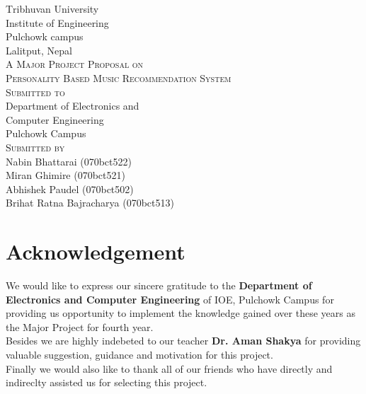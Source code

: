 \documentclass{article}
\begin{document}
\begin{titlepage}
  \begin{center}
    {\Huge\textsc Tribhuvan University}\\
    [0.03in]
    {\LARGE\textsc Institute of Engineering}\\
    [0.05in]
    {\Large\textsc Pulchowk campus}\\
    [0.02in]
    {\large\textsc Lalitput, Nepal}\\
    [2in]

    {\LARGE \textsc{A Major Project Proposal on}}\\
    [0.5cm]
    {\Large \textsc{Personality Based Music Recommendation System}}\\
    [1.8in]
    
    {\LARGE\textsc{Submitted to}}\\
    [0.05in]
    {\large Department of Electronics and }\\
    {\large Computer Engineering}\\
    {\large Pulchowk Campus}\\
    [1in]

    {\LARGE \textsc{\large Submitted by}}\\
    [0.05in]
    {\large Nabin Bhattarai (070bct522)}\\
    {\large Miran Ghimire (070bct521)}\\
    {\large Abhishek Paudel (070bct502)}\\
    {\large Brihat Ratna Bajracharya (070bct513)}\\
  \end{center}
\end{titlepage}

\setcounter{page}{2}

\section*{Acknowledgement}
	We would like to express our sincere gratitude to the \textbf{Department of Electronics and Computer Engineering }of IOE, Pulchowk Campus for providing us opportunity to implement the knowledge gained over these years as the Major Project for fourth year.\\ 
	Besides we are highly indebeted to our teacher \textbf{Dr. Aman Shakya} for providing valuable suggestion, guidance and motivation for this project.\\
Finally we would also like to thank all of our friends who have directly and indireclty assisted us for selecting this project.
\cleardoublepage
\end{document}
